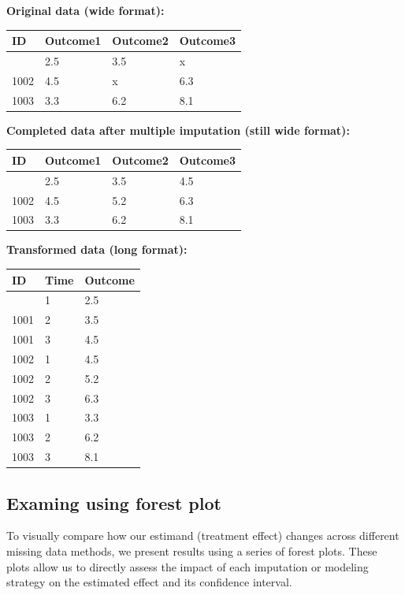 \documentclass{article}
\begin{document}
\textbf{Original data (wide format):}

\begin{longtable}[]{@{}llll@{}}
\toprule\noalign{}
ID & Outcome1 & Outcome2 & Outcome3 \\
\midrule\noalign{}
\endhead
\bottomrule\noalign{}
\endlastfoot
1001 & 2.5 & 3.5 & x \\
1002 & 4.5 & x & 6.3 \\
1003 & 3.3 & 6.2 & 8.1 \\
\end{longtable}

\textbf{Completed data after multiple imputation (still wide format):}

\begin{longtable}[]{@{}llll@{}}
\toprule\noalign{}
ID & Outcome1 & Outcome2 & Outcome3 \\
\midrule\noalign{}
\endhead
\bottomrule\noalign{}
\endlastfoot
1001 & 2.5 & 3.5 & 4.5 \\
1002 & 4.5 & 5.2 & 6.3 \\
1003 & 3.3 & 6.2 & 8.1 \\
\end{longtable}

\textbf{Transformed data (long format):}

\begin{longtable}[]{@{}lll@{}}
\toprule\noalign{}
ID & Time & Outcome \\
\midrule\noalign{}
\endhead
\bottomrule\noalign{}
\endlastfoot
1001 & 1 & 2.5 \\
1001 & 2 & 3.5 \\
1001 & 3 & 4.5 \\
1002 & 1 & 4.5 \\
1002 & 2 & 5.2 \\
1002 & 3 & 6.3 \\
1003 & 1 & 3.3 \\
1003 & 2 & 6.2 \\
1003 & 3 & 8.1 \\
\end{longtable}

\subsection{Examing using forest plot}\label{examing-using-forest-plot}

To visually compare how our estimand (treatment effect) changes across
different missing data methods, we present results using a series of
forest plots. These plots allow us to directly assess the impact of each
imputation or modeling strategy on the estimated effect and its
confidence interval.
\end{document}

